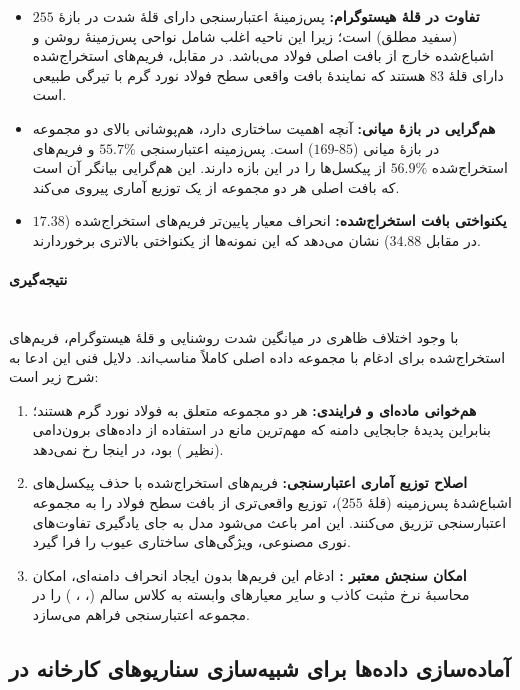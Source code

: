 \documentclass[a4paper, 10pt, twocolumn]{article}
\begin{document}
	\begin{itemize}
		\item \textbf{تفاوت در قلهٔ هیستوگرام:}
		پس‌زمینهٔ اعتبارسنجی دارای قلهٔ شدت در بازهٔ $255$ (سفید مطلق) است؛ زیرا این ناحیه اغلب شامل نواحی پس‌زمینهٔ روشن و اشباع‌شده خارج از بافت اصلی فولاد می‌باشد. در مقابل، فریم‌های استخراج‌شده دارای قلهٔ $83$ هستند که نمایندهٔ بافت واقعی سطح فولاد نورد گرم با تیرگی طبیعی است.
		\item \textbf{هم‌گرایی در بازهٔ میانی:}
		آنچه اهمیت ساختاری دارد، هم‌پوشانی بالای دو مجموعه در بازهٔ میانی ($85$-$169$) است. پس‌زمینه اعتبارسنجی $55.7\%$ و فریم‌های استخراج‌شده $56.9\%$ از پیکسل‌ها را در این بازه دارند. این هم‌گرایی بیانگر آن است که بافت اصلی هر دو مجموعه از یک توزیع آماری پیروی می‌کند.
		\item \textbf{یکنواختی بافت استخراج‌شده:} 
		انحراف معیار پایین‌تر فریم‌های استخراج‌شده ($17.38$ در مقابل $34.88$) نشان می‌دهد که این نمونه‌ها از یکنواختی بالاتری برخوردارند.
	\end{itemize}
	
	\paragraph{نتیجه‌گیری} \mbox{} \\
	
	با وجود اختلاف ظاهری در میانگین شدت روشنایی و قلهٔ هیستوگرام، فریم‌های استخراج‌شده برای ادغام با مجموعه داده اصلی کاملاً مناسب‌اند. دلایل فنی این ادعا به شرح زیر است:
	
	\begin{enumerate}
		\item \textbf{هم‌خوانی ماده‌ای و فرایندی:}
		هر دو مجموعه متعلق به فولاد نورد گرم هستند؛ بنابراین پدیدهٔ جابجایی دامنه که مهم‌ترین مانع در استفاده از داده‌های برون‌دامی (نظیر ) بود، در اینجا رخ نمی‌دهد.
		\item \textbf{اصلاح توزیع آماری اعتبارسنجی:}
		فریم‌های استخراج‌شده با حذف پیکسل‌های اشباع‌شدهٔ پس‌زمینه (قلهٔ $255$)، توزیع واقعی‌تری از بافت سطح فولاد را به مجموعه اعتبارسنجی تزریق می‌کنند. این امر باعث می‌شود مدل به جای یادگیری تفاوت‌های نوری مصنوعی، ویژگی‌های ساختاری عیوب را فرا گیرد.
		\item \textbf{امکان سنجش معتبر :}
		ادغام این فریم‌ها بدون ایجاد انحراف دامنه‌ای، امکان محاسبهٔ نرخ مثبت کاذب و سایر معیارهای وابسته به کلاس سالم (، ، ) را در مجموعه اعتبارسنجی فراهم می‌سازد.
	\end{enumerate}
	
	\subsection{آماده‌سازی داده‌ها برای شبیه‌سازی سناریوهای کارخانه در }
	
\end{document}
